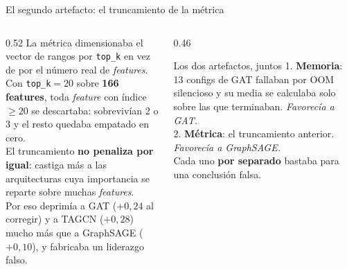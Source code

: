 \documentclass[aspectratio=169,11pt]{beamer}
\begin{document}
\begin{frame}{El segundo artefacto: el truncamiento de la métrica}
\begin{columns}[T]
\begin{column}{0.52\textwidth}
\footnotesize
La métrica dimensionaba el vector de rangos por \texttt{top\_k} en vez de por el número real de \emph{features}.\\[4pt]
Con \texttt{top\_k}$=20$ sobre \textbf{166 features}, toda \emph{feature} con índice $\geq 20$ se descartaba: sobrevivían 2 o 3 y el resto quedaba empatado en cero.\\[4pt]
El truncamiento \textbf{no penaliza por igual}: castiga más a las arquitecturas cuya importancia se reparte sobre muchas \emph{features}.\\[4pt]
{\color{muted}Por eso deprimía a GAT ($+0{,}24$ al corregir) y a TAGCN ($+0{,}28$) mucho más que a GraphSAGE ($+0{,}10$), y fabricaba un liderazgo falso.}
\end{column}
\begin{column}{0.46\textwidth}
\begin{block}{Los dos artefactos, juntos}
\footnotesize
1. \textbf{Memoria}: 13 configs de GAT fallaban por OOM silencioso y su media se calculaba solo sobre las que terminaban. \emph{Favorecía a GAT.}\\[4pt]
2. \textbf{Métrica}: el truncamiento anterior. \emph{Favorecía a GraphSAGE.}\\[4pt]
Cada uno \textbf{por separado} bastaba para una conclusión falsa.
\end{block}
\end{column}
\end{columns}
\end{frame}
\end{document}
